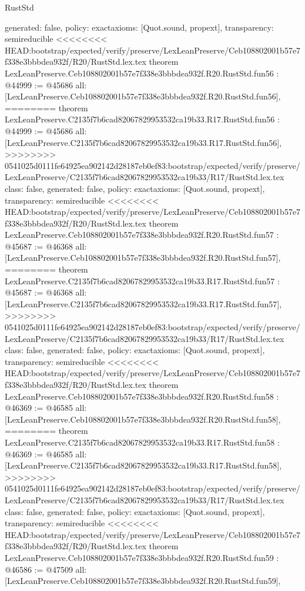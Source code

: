 \begin{lexlean}{RustStd}
\begin{coremodule}
{\begin{coremodule}
{{{{{{{{{{{{{{{{{{{{{{{{{{{{{{{{{{{{{{{{{{{{{{{{{{{{{{{{{{{  generated: false,
  policy: exact{axioms: [Quot.sound, propext]},
  transparency: semireducible
}
<<<<<<<< HEAD:bootstrap/expected/verify/preserve/LexLeanPreserve/Ceb108802001b57e7f338e3bbbdea932f/R20/RustStd.lex.tex
theorem LexLeanPreserve.Ceb108802001b57e7f338e3bbbdea932f.R20.RustStd.fun56 : @44999 := @45686 {
  all: [LexLeanPreserve.Ceb108802001b57e7f338e3bbbdea932f.R20.RustStd.fun56],
========
theorem LexLeanPreserve.C2135f7b6cad82067829953532ca19b33.R17.RustStd.fun56 : @44999 := @45686 {
  all: [LexLeanPreserve.C2135f7b6cad82067829953532ca19b33.R17.RustStd.fun56],
>>>>>>>> 0541025d0111fe64925ea902142d28187eb0ef83:bootstrap/expected/verify/preserve/LexLeanPreserve/C2135f7b6cad82067829953532ca19b33/R17/RustStd.lex.tex
  class: false,
  generated: false,
  policy: exact{axioms: [Quot.sound, propext]},
  transparency: semireducible
}
<<<<<<<< HEAD:bootstrap/expected/verify/preserve/LexLeanPreserve/Ceb108802001b57e7f338e3bbbdea932f/R20/RustStd.lex.tex
theorem LexLeanPreserve.Ceb108802001b57e7f338e3bbbdea932f.R20.RustStd.fun57 : @45687 := @46368 {
  all: [LexLeanPreserve.Ceb108802001b57e7f338e3bbbdea932f.R20.RustStd.fun57],
========
theorem LexLeanPreserve.C2135f7b6cad82067829953532ca19b33.R17.RustStd.fun57 : @45687 := @46368 {
  all: [LexLeanPreserve.C2135f7b6cad82067829953532ca19b33.R17.RustStd.fun57],
>>>>>>>> 0541025d0111fe64925ea902142d28187eb0ef83:bootstrap/expected/verify/preserve/LexLeanPreserve/C2135f7b6cad82067829953532ca19b33/R17/RustStd.lex.tex
  class: false,
  generated: false,
  policy: exact{axioms: [Quot.sound, propext]},
  transparency: semireducible
}
<<<<<<<< HEAD:bootstrap/expected/verify/preserve/LexLeanPreserve/Ceb108802001b57e7f338e3bbbdea932f/R20/RustStd.lex.tex
theorem LexLeanPreserve.Ceb108802001b57e7f338e3bbbdea932f.R20.RustStd.fun58 : @46369 := @46585 {
  all: [LexLeanPreserve.Ceb108802001b57e7f338e3bbbdea932f.R20.RustStd.fun58],
========
theorem LexLeanPreserve.C2135f7b6cad82067829953532ca19b33.R17.RustStd.fun58 : @46369 := @46585 {
  all: [LexLeanPreserve.C2135f7b6cad82067829953532ca19b33.R17.RustStd.fun58],
>>>>>>>> 0541025d0111fe64925ea902142d28187eb0ef83:bootstrap/expected/verify/preserve/LexLeanPreserve/C2135f7b6cad82067829953532ca19b33/R17/RustStd.lex.tex
  class: false,
  generated: false,
  policy: exact{axioms: [Quot.sound, propext]},
  transparency: semireducible
}
<<<<<<<< HEAD:bootstrap/expected/verify/preserve/LexLeanPreserve/Ceb108802001b57e7f338e3bbbdea932f/R20/RustStd.lex.tex
theorem LexLeanPreserve.Ceb108802001b57e7f338e3bbbdea932f.R20.RustStd.fun59 : @46586 := @47509 {
  all: [LexLeanPreserve.Ceb108802001b57e7f338e3bbbdea932f.R20.RustStd.fun59],
}}}}}}}}}}}}}}}}}}}}}}}}}}}}}}}}}}}}}}}}}}}}}}}}}}}}}}}}}}}}}}
\end{coremodule}}
\end{coremodule}
\end{lexlean}
